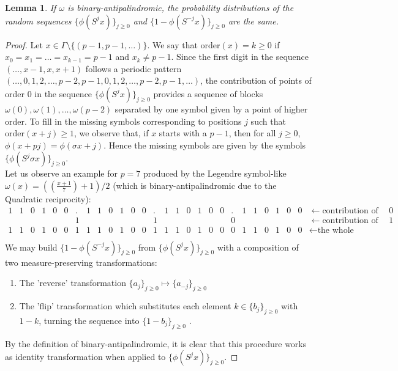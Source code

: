 \documentclass[a4paper]{article}
\theoremstyle{plain}
\newtheorem{lemma}{Lemma}[section]
\theoremstyle{definition}
\begin{document}
\begin{lemma} \label{binDistLemma}
If $\omega$ is binary-antipalindromic, the probability distributions of the random sequences $\{\phi(S^j x)\}_{j \ge 0}$ and $\{ 1 - \phi(S^{-j} x)\}_{j \ge 0}$ are the same.
\end{lemma}
\begin{proof}
Let $x \in \Gamma \setminus \{(p-1,p-1,\ldots)\}$. We
say that $\mathrm{order}(x) = k \ge 0$ if $x_0=x_1=\ldots=x_{k-1}=p-1$ and $x_k \ne p-1$.
Since the first digit in the sequence $(\ldots, x-1,x,x+1)$ follows a periodic pattern
$(\ldots, 0, 1, 2, \ldots,p-2, p-1, 0, 1, 2, \ldots,p-2, p-1, \ldots)$, the contribution of points of order $0$ in the sequence
$\{\phi(S^j x)\}_{j \ge 0}$ provides a sequence of blocks $\omega(0),\omega(1),\ldots, \omega(p-2)$ separated by one symbol
given by a point of higher order. To fill in the missing symbols corresponding to positions $j$ 
such that $\mathrm{order}(x+j) \ge 1$, we observe that, if $x$ starts with a $p-1$, then for all $j \ge 0$, $\phi(x+pj)=\phi(\sigma x + j)$. Hence the missing symbols are given by the symbols $\{\phi(S^j \sigma x)\}_{j \ge 0}$.\\
Let us observe an example for $p=7$ produced by the Legendre symbol-like $\omega(x)=((\frac{x+1}{7}) + 1)/2$ (which is binary-antipalindromic due to the Quadratic reciprocity):\bigskip\\
$\begin{array}{cccccccccccccccccccccccccccl}
1 & 1 & 0 & 1 & 0 & 0 & . & 1 & 1 & 0 & 1 & 0 & 0 &. & 1 & 1 & 0 & 1 & 0 & 0 & . & 1 & 1 & 0 & 1 & 0 & 0 &\leftarrow \text{contribution of order }0 \\
  &   &   &   &   &   & 1 &   &   &   &   &   &   &1 &   &   &   &   &   &   & 0 &   &   &   &   &   &   &\leftarrow \text{contribution of order }1 \\
1 & 1 & 0 & 1 & 0 & 0 & 1 & 1 & 1 & 0 & 1 & 0 & 0 & 1 & 1 & 1 & 0 & 1 & 0 & 0 & 0 & 1 & 1 & 0 & 1 & 0 & 0 &\leftarrow \text{the whole sequence} \\
\end{array}$
\bigskip\\
We may build $\{ 1 - \phi(S^{-j} x)\}_{j \ge 0}$ from $\{\phi(S^j x)\}_{j \ge 0}$ with a composition of two measure-preserving transformations:
\begin{enumerate}
\item The 'reverse' transformation  $\{a_j\}_{j \ge 0} \mapsto \{a_{-j}\}_{j \ge 0}$ 
\item The 'flip' transformation which substitutes each element $k \in \{b_j\}_{j \ge 0}$ with $1-k$, turning the sequence into $\{ 1 - b_j\}_{j \ge 0}$ .
\end{enumerate}
By the definition of binary-antipalindromic, it is clear that this procedure works as identity transformation when applied to $\{\phi(S^j x)\}_{j \ge 0}$.
\end{proof}
\end{document}
